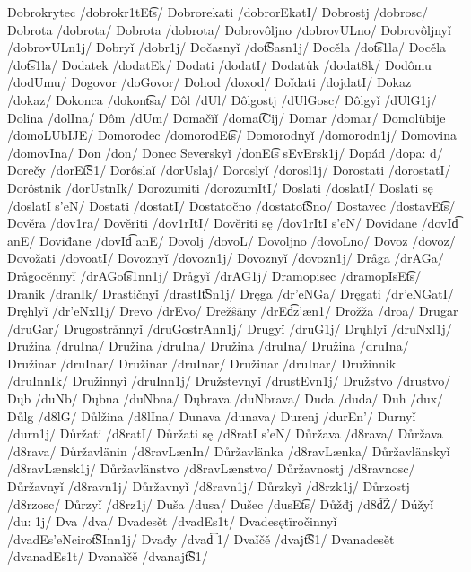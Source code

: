 Dobrokrytec /dobrokr1tE\t{ts}/
Dobrorekati /dobrorEkatI/
Dobrostj /dobrosc/
Dobrota /dobrota/
Dobrota /dobrota/
Dobrovôljno /dobrovULno/
Dobrovôljnyǐ /dobrovULn1j/
Dobryǐ /dobr1j/
Dočasnyǐ /do\t{tS}asn1j/
Docěla /do\t{ts}1la/
Docěla /do\t{ts}1la/
Dodatek /dodatEk/
Dodati /dodatI/
Dodatůk /dodat8k/
Dodômu /dodUmu/
Dogovor /doGovor/
Dohod /doxod/
Doǐdati /dojdatI/
Dokaz /dokaz/
Dokonca /dokon\t{ts}a/
Dôl /dUl/
Dôlgostj /dUlGosc/
Dôlgyǐ /dUlG1j/
Dolina /dolIna/
Dôm /dUm/
Domačïǐ /doma\t{tC}ij/
Domar /domar/
Domolübije /domoL\:UbIJE/
Domorodec /domorodE\t{ts}/
Domorodnyǐ /domorodn1j/
Domovina /domovIna/
Don /don/
Donec Severskyǐ /donE\t{ts} sEvErsk1j/
Dopád /dopa: d/
Dorečy /dorE\t{tS}1/
Dorôslaǐ /dorUslaj/
Doroslyǐ /dorosl1j/
Dorostati /dorostatI/
Dorôstnik /dorUstnIk/
Dorozumiti /dorozumItI/
Doslati /doslatI/
Doslati sę /doslatI s’eN/
Dostati /dostatI/
Dostatočno /dostato\t{tS}no/
Dostavec /dostavE\t{ts}/
Dověra /dov1ra/
Dověriti /dov1rItI/
Dověriti sę /dov1rItI s’eN/
Doviđane /dovI\t{d \textctz}anE/
Doviđane /dovI\t{d \textctz}anE/
Dovolj /dovoL/
Dovoljno /dovoLno/
Dovoz /dovoz/
Dovožati /dovo\textctz  atI/
Dovoznyǐ /dovozn1j/
Dovoznyǐ /dovozn1j/
Dråga /drAGa/
Drågocěnnyǐ /drAGo\t{ts}1nn1j/
Drågyǐ /drAG1j/
Dramopisec /dramopIsE\t{ts}/
Dranik /dranIk/
Drastičnyǐ /drastI\t{tS}n1j/
Dręga /dr’eNGa/
Dręgati /dr’eNGatI/
Dręhlyǐ /dr’eNxl1j/
Drevo /drEvo/
Drežŝäny /drE\textctz  \t{dz}’æn1/
Drožža /dro\textctz  \textctz  a/
Drugar /druGar/
Drugostrånnyǐ /druGostrAnn1j/
Drugyǐ /druG1j/
Drųhlyǐ /druNxl1j/
Družina /dru\textctz  Ina/
Družina /dru\textctz  Ina/
Družina /dru\textctz  Ina/
Družina /dru\textctz  Ina/
Družinar /dru\textctz  Inar/
Družinar /dru\textctz  Inar/
Družinar /dru\textctz  Inar/
Družinnik /dru\textctz  InnIk/
Družinnyǐ /dru\textctz  Inn1j/
Družstevnyǐ /dru\textctz  stEvn1j/
Družstvo /dru\textctz  stvo/
Dųb /duNb/
Dųbna /duNbna/
Dųbrava /duNbrava/
Duda /duda/
Duh /dux/
Důlg /d8lG/
Důlžina /d8l\textctz  Ina/
Dunava /dunava/
Durenj /durEn’/
Durnyǐ /durn1j/
Důržati /d8r\textctz  atI/
Důržati sę /d8r\textctz  atI s’eN/
Důržava /d8r\textctz  ava/
Důržava /d8r\textctz  ava/
Důržavlänin /d8r\textctz  avLænIn/
Důržavlänka /d8r\textctz  avLænka/
Důržavlänskyǐ /d8r\textctz  avLænsk1j/
Důržavlänstvo /d8r\textctz  avLænstvo/
Důržavnostj /d8r\textctz  avnosc/
Důržavnyǐ /d8r\textctz  avn1j/
Důržavnyǐ /d8r\textctz  avn1j/
Důrzkyǐ /d8rzk1j/
Důrzostj /d8rzosc/
Důrzyǐ /d8rz1j/
Duša /du\:sa/
Dušec /du\:sE\t{ts}/
Důžđj /d8\textctz  \t{dZ}/
Dúžyǐ /du: \textctz  1j/
Dva /dva/
Dvadesět /dvadEs1t/
Dvadesętïročinnyǐ /dvadEs’eNciro\t{tS}Inn1j/
Dvađy /dva\t{d \textctz}1/
Dvaǐčě /dvaj\t{tS}1/
Dvanadesět /dvanadEs1t/
Dvanaǐčě /dvanaj\t{tS}1/

